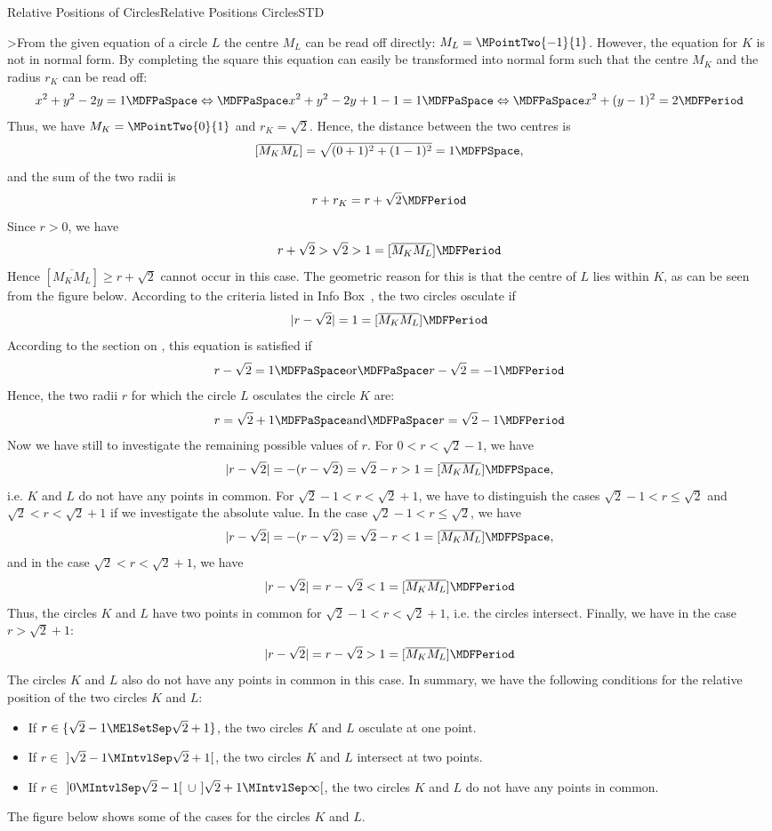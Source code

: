 \begin{MXContent}{Relative Positions of Circles}{Relative Positions Circles}{STD}
\begin{MExample}
>From the given equation of a circle $L$ the centre $M_L$ can be read off directly: $M_L=\MPointTwo{-1}{1}$. However,
the equation for $K$ is not in normal form. By completing the square this equation can easily be transformed
into normal form such that the centre $M_K$ and the radius $r_K$ can be read off:
\[
 x^2+y^2-2y=1\MDFPaSpace\Leftrightarrow\MDFPaSpace x^2+y^2-2y+1-1=1\MDFPaSpace\Leftrightarrow\MDFPaSpace x^2+(y-1)^2=2\MDFPeriod
\]
Thus, we have $M_K=\MPointTwo{0}{1}$ and $r_K=\sqrt{2}$. Hence, the distance between the two centres is
\[
 [\overline{M_K M_L}]=\sqrt{(0+1)^2+(1-1)^2}=1 \MDFPSpace ,
\]
and the sum of the two radii is
\[
 r+r_K=r+\sqrt{2} \MDFPeriod
\]
Since $r>0$, we have 
\[
 r+\sqrt{2}>\sqrt{2}>1=[\overline{M_K M_L}] \MDFPeriod
\]
Hence $[\overline{M_K M_L}]\geq r+\sqrt{2}$ cannot occur in this case. The geometric reason for this is that
the centre of $L$ lies within $K$, as can be seen from the figure below. According 
to the criteria listed in Info Box~, the two circles osculate if 
\[
 |r-\sqrt{2}|=1=[\overline{M_K M_L}]\MDFPeriod 
\]
According to the section on , this equation is satisfied if
\[
 r-\sqrt{2}=1\MDFPaSpace\textrm{or}\MDFPaSpace r-\sqrt{2}=-1\MDFPeriod
\]
Hence, the two radii $r$ for which the circle $L$ osculates the circle $K$ are:
\[
 r=\sqrt{2}+1\MDFPaSpace\textrm{and}\MDFPaSpace r=\sqrt{2}-1\MDFPeriod
\]
Now we have still to investigate the remaining possible values of $r$. For $0<r<\sqrt{2}-1$, we have
\[
 |r-\sqrt{2}|=-(r-\sqrt{2})=\sqrt{2}-r>1=[\overline{M_K M_L}] \MDFPSpace ,
\]
i.e. $K$ and $L$ do not have any points in common. For $\sqrt{2}-1<r<\sqrt{2}+1$, we have to distinguish 
the cases $\sqrt{2}-1<r\leq\sqrt{2}$ and $\sqrt{2}<r<\sqrt{2}+1$ if we investigate the absolute value. In the case
$\sqrt{2}-1<r\leq\sqrt{2}$, we have
\[
 |r-\sqrt{2}|=-(r-\sqrt{2})=\sqrt{2}-r<1=[\overline{M_K M_L}] \MDFPSpace ,
\]
and in the case $\sqrt{2}<r<\sqrt{2}+1$, we have
\[
 |r-\sqrt{2}|=r-\sqrt{2}<1=[\overline{M_K M_L}] \MDFPeriod
\]
Thus, the circles $K$ and $L$ have two points in common for $\sqrt{2}-1<r<\sqrt{2}+1$, i.e. the circles intersect. 
Finally, we have in the case $r>\sqrt{2}+1$:
\[
 |r-\sqrt{2}|=r-\sqrt{2}>1=[\overline{M_K M_L}]\MDFPeriod
\]
The circles $K$ and $L$ also do not have any points in common in this case. In summary, we have the following 
conditions for the relative position of the two circles $K$ and $L$:
\begin{itemize}
 \item If $r\in\{\sqrt{2}-1\MElSetSep\sqrt{2}+1\}$, the two circles $K$ and $L$ osculate at one point.
 \item If $r\in$ $]\sqrt{2}-1\MIntvlSep\sqrt{2}+1[$, the two circles $K$ and $L$ intersect at two points.
 \item If $r\in$ $]0\MIntvlSep\sqrt{2}-1[$ $\cup$ $]\sqrt{2}+1\MIntvlSep\infty[$, the two circles $K$ and $L$ do
  not have any points in common.
\end{itemize}
The figure below shows some of the cases for the circles $K$ and $L$.
\begin{center}
 

\end{center}
\end{MExample}
\end{MXContent}
